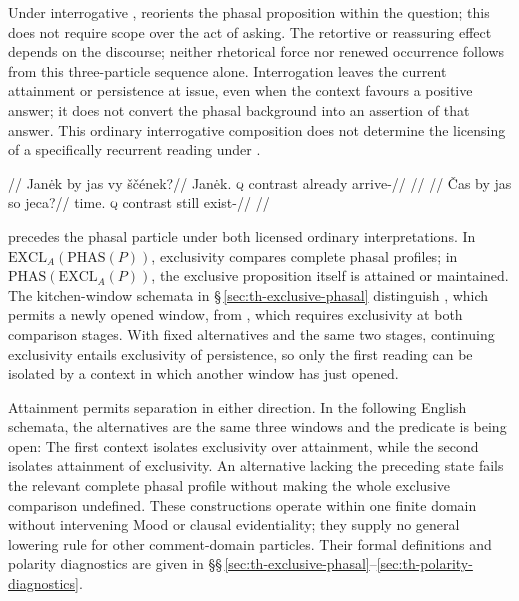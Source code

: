 Under interrogative ,  reorients the phasal
proposition within the question; this does not require scope over the act
of asking. The retortive or reassuring effect depends
on the discourse; neither rhetorical force nor renewed occurrence follows
from this three-particle sequence alone. Interrogation leaves the current
attainment or persistence at issue, even when the context favours a positive
answer; it does not convert the phasal background into an assertion of that
answer. This ordinary interrogative composition does not determine the
licensing of a specifically recurrent reading under .

\pex
\a
\begingl
\glpreamble {}//
\gla Janėk by jas vy ščének?//
\glb Janėk.\Dir{} \textsc{q} contrast already arrive-\Pf{}//
\glft {}//
\endgl
\a
\begingl
\glpreamble {}//
\gla Čas by jas so jeca?//
\glb time.\Dir{} \textsc{q} contrast still exist-\Cont{}//
\glft {}//
\endgl
\xe

 precedes the phasal particle under both licensed ordinary
interpretations. In $\mathrm{EXCL}_{A}(\mathrm{PHAS}(P))$, exclusivity
compares complete phasal profiles; in
$\mathrm{PHAS}(\mathrm{EXCL}_{A}(P))$, the exclusive proposition itself
is attained or maintained. The kitchen-window schemata in
§\,\ref{sec:th-exclusive-phasal} distinguish , which permits a newly opened window, from , which requires exclusivity at both
comparison stages. With fixed alternatives and the same two stages,
continuing exclusivity entails exclusivity of persistence, so only the first
reading can be isolated by a context in which another window has just opened.

Attainment permits separation in either direction. In the following English
schemata, the alternatives are the same three windows and the predicate is
being open:
\pex
\a {}
\a {}
\xe
The first context isolates exclusivity over attainment, while the second
isolates attainment of exclusivity. An alternative lacking the preceding
state fails the relevant complete phasal profile without making the whole
exclusive comparison undefined. These constructions operate within one finite
domain without intervening Mood or clausal evidentiality; they supply no
general lowering rule for other comment-domain particles. Their formal
definitions and polarity diagnostics are given in
§§\,\ref{sec:th-exclusive-phasal}--\ref{sec:th-polarity-diagnostics}.

